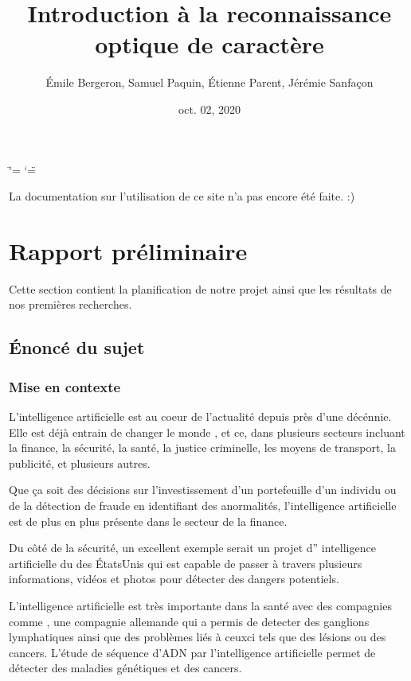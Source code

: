 \documentclass[letterpaper,10pt,french]{sphinxmanual}
\title{Introduction à la reconnaissance optique de caractère}
\date{oct. 02, 2020}
\author{Émile Bergeron, Samuel Paquin, Étienne Parent, Jérémie Sanfaçon}
\begin{document}
\ifdefined\shorthandoff
  \ifnum\catcode`\=\string=\active\shorthandoff{=}\fi
  \ifnum\catcode`\"=\active{}\fi
\fi

\pagestyle{empty}
\sphinxmaketitle
\pagestyle{plain}
\sphinxtableofcontents
\pagestyle{normal}
\label{\detokenize{intro::doc}}


La documentation sur l’utilisation de ce site n’a pas encore été faite. :)


\chapter{Rapport préliminaire}
\label{\detokenize{rapport_preliminaire:rapport-preliminaire}}\label{\detokenize{rapport_preliminaire::doc}}
Cette section contient la planification de notre projet ainsi que les
résultats de nos premières recherches.


\section{Énoncé du sujet}
\label{\detokenize{enonce_sujet:enonce-du-sujet}}\label{\detokenize{enonce_sujet::doc}}

\subsection{Mise en contexte}
\label{\detokenize{enonce_sujet:mise-en-contexte}}
L’intelligence artificielle est au coeur de l’actualité depuis près d’une
décénnie. Elle est déjà entrain de changer le monde , et ce, dans plusieurs
secteurs incluant la finance, la sécurité, la santé, la justice criminelle,
les moyens de transport, la publicité, et plusieurs autres.

Que ça soit des décisions sur l’investissement d’un portefeuille
d’un individu ou de la détection de fraude en identifiant des anormalités, l’intelligence
artificielle est de plus en plus présente dans le secteur de la finance.

Du côté de la
sécurité, un excellent exemple serait 
un projet d” intelligence artificielle du 
des États\sphinxhyphen{}Unis qui est capable de passer à travers plusieurs informations,
vidéos et photos pour détecter des dangers potentiels.

L’intelligence artificielle est très importante dans la santé avec des compagnies comme
, une compagnie allemande qui a permis de detecter
des ganglions lymphatiques ainsi que des problèmes liés à ceux\sphinxhyphen{}ci tels que des lésions
ou des cancers. L’étude de séquence d’ADN par l’intelligence artificielle permet de détecter
des maladies génétiques et des cancers.
\end{document}
